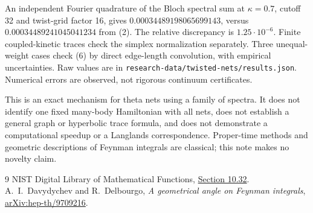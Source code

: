 \documentclass[11pt]{article}
\begin{document}
An independent Fourier quadrature of the Bloch spectral sum at
\(\kappa=0.7\), cutoff 32 and twist-grid factor 16, gives
\(0.00034489198065699143\), versus
\(0.00034489241045041234\) from (2). The relative discrepancy is
\(1.25\cdot10^{-6}\). Finite coupled-kinetic traces check the simplex
normalization separately. Three unequal-weight cases check (6) by
direct edge-length convolution, with empirical uncertainties.
Raw values are in \texttt{research-data/twisted-nets/results.json}.
Numerical errors are observed, not rigorous continuum certificates.

This is an exact mechanism for theta nets using a family of spectra.
It does not identify one fixed many-body Hamiltonian with all nets,
does not establish a general graph or hyperbolic trace formula, and
does not demonstrate a computational speedup or a Langlands
correspondence. Proper-time methods and geometric descriptions of
Feynman integrals are classical; this note makes no novelty claim.

\begin{thebibliography}{9}
 NIST Digital Library of Mathematical Functions,
\href{https://dlmf.nist.gov/10.32}{Section 10.32}.
 A.~I.~Davydychev and R.~Delbourgo,
\emph{A geometrical angle on Feynman integrals},
\href{https://arxiv.org/abs/hep-th/9709216}{arXiv:hep-th/9709216}.
\end{thebibliography}
\end{document}
